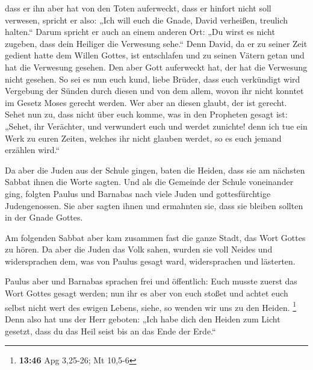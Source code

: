  dass er ihn aber hat von den Toten auferweckt, dass er
hinfort nicht soll verwesen, spricht er also: „Ich will euch die Gnade,
David verheißen, treulich halten.``  Darum spricht er
auch an einem anderen Ort: „Du wirst es nicht zugeben, dass dein
Heiliger die Verwesung sehe.``  Denn David, da er zu
seiner Zeit gedient hatte dem Willen Gottes, ist entschlafen und zu
seinen Vätern getan und hat die Verwesung gesehen.  Den
aber Gott auferweckt hat, der hat die Verwesung nicht gesehen.
 So sei es nun euch kund, liebe Brüder, dass euch
verkündigt wird Vergebung der Sünden durch diesen und von dem allem,
wovon ihr nicht konntet im Gesetz Moses gerecht werden. 
Wer aber an diesen glaubt, der ist gerecht.  Sehet nun
zu, dass nicht über euch komme, was in den Propheten gesagt ist:
 „Sehet, ihr Verächter, und verwundert euch und werdet
zunichte! denn ich tue ein Werk zu euren Zeiten, welches ihr nicht
glauben werdet, so es euch jemand erzählen wird.``

 Da aber die Juden aus der Schule gingen, baten die
Heiden, dass sie am nächsten Sabbat ihnen die Worte sagten.
 Und als die Gemeinde der Schule voneinander ging,
folgten Paulus und Barnabas nach viele Juden und gottesfürchtige
Judengenossen. Sie aber sagten ihnen und ermahnten sie, dass sie bleiben
sollten in der Gnade Gottes.

 Am folgenden Sabbat aber kam zusammen fast die ganze
Stadt, das Wort Gottes zu hören.  Da aber die Juden das
Volk sahen, wurden sie voll Neides und widersprachen dem, was von Paulus
gesagt ward, widersprachen und lästerten.

 Paulus aber und Barnabas sprachen frei und öffentlich:
Euch musste zuerst das Wort Gottes gesagt werden; nun ihr es aber von
euch stoßet und achtet euch selbst nicht wert des ewigen Lebens, siehe,
so wenden wir uns zu den Heiden. \footnote{\textbf{13:46} Apg 3,25-26;
  Mt 10,5-6}  Denn also hat uns der Herr geboten: „Ich
habe dich den Heiden zum Licht gesetzt, dass du das Heil seist bis an
das Ende der Erde.``

